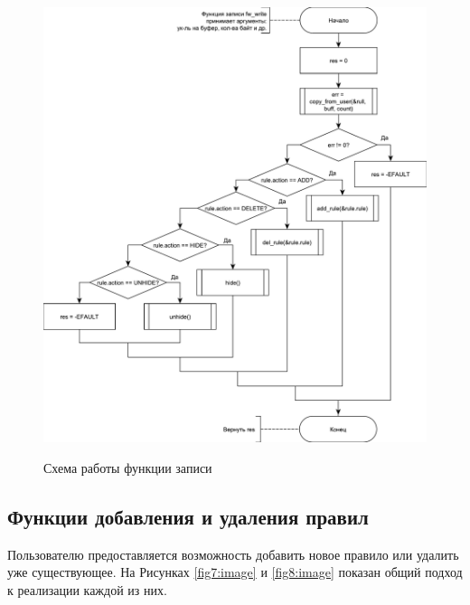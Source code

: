 \begin{figure}[h!]
	\begin{center}
		{\includegraphics[scale = 0.6]{img/write.pdf}}
		\caption{Схема работы функции записи}
		\label{fig6:image}
	\end{center}
\end{figure}

\newpage

\subsection{Функции добавления и удаления правил}
Пользователю предоставляется возможность добавить новое правило или удалить уже существующее. На Рисунках \ref{fig7:image} и \ref{fig8:image} показан общий подход к реализации каждой из них.

